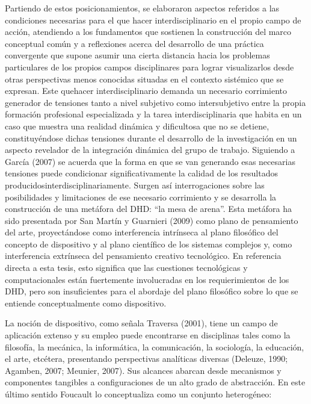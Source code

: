Partiendo de estos posicionamientos, se elaboraron aspectos referidos   a   
las condiciones    necesarias   para   el  que hacer interdisciplinario  en  el 
propio   campo    de   acción,  atendiendo a los fundamentos que sostienen la
construcción del marco conceptual común y a reflexiones acerca del desarrollo de
una práctica convergente que supone asumir una cierta distancia hacia los
problemas particulares de los propios    campos    disciplinares  para   lograr 
visualizarlos  desde  otras perspectivas menos conocidas situadas en el contexto
sistémico que se expresan. Este quehacer interdisciplinario demanda un necesario
corrimiento generador de  tensiones   tanto  a  nivel   subjetivo como
intersubjetivo entre la propia formación profesional especializada y la tarea
interdisciplinaria que habita en un caso que muestra una realidad dinámica
y dificultosa que no se detiene, constituyéndose dichas tensiones durante
el desarrollo de la investigación en un aspecto revelador de la integración
dinámica del grupo de trabajo. Siguiendo a García (2007) se acuerda que la forma
en que se van generando esas necesarias tensiones puede condicionar
significativamente la calidad de los resultados
producidosinterdisciplinariamente. Surgen así interrogaciones sobre las
posibilidades y limitaciones de ese necesario corrimiento y se desarrolla la
construcción de una  metáfora del DHD: “la mesa de arena”. Esta metáfora ha sido
presentada por San Martín y Guarnieri (2009) como plano de pensamiento del arte,
proyectándose como interferencia intrínseca al plano filosófico del concepto de
dispositivo y al plano científico de los sistemas complejos y, como
interferencia extrínseca del pensamiento creativo tecnológico. En referencia
directa a esta tesis, esto significa que las cuestiones tecnológicas y
computacionales están fuertemente involucradas en los requierimientos de los
DHD, pero son insuficientes para el abordaje del plano filosófico sobre lo que
se entiende conceptualmente como dispositivo. 


La noción de dispositivo, como señala Traversa (2001), tiene un
campo de aplicación extenso y su empleo puede encontrarse en disciplinas
tales como la filosofía, la mecánica, la informática, la comunicación, la
sociología, la educación, el arte, etcétera, presentando perspectivas
analíticas diversas (Deleuze, 1990; Agamben, 2007; Meunier, 2007). Sus
alcances abarcan  desde mecanismos y  componentes tangibles a
configuraciones de un alto grado de abstracción. En este último sentido
Foucault lo conceptualiza como un conjunto heterogéneo:
      
